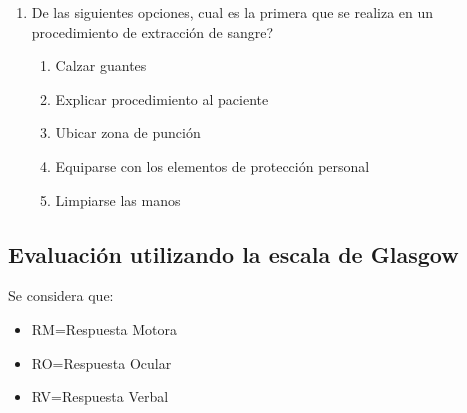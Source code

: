 \begin{enumerate}[label=\bfseries OE\arabic*.:]
\begin{enumerate}
    \end{enumerate}
\item De las siguientes opciones, cual es la primera que se realiza en un
    procedimiento de extracción de sangre?
    \begin{enumerate}
    \item Calzar guantes
    \item Explicar procedimiento al paciente
    \item Ubicar zona de punción
    \item Equiparse con los elementos de protección personal
    \item Limpiarse las manos
    \end{enumerate}
\end{enumerate}

\subsection{Evaluación utilizando la escala de Glasgow}

Se considera que:
\begin{itemize}
\item RM=Respuesta Motora
\item RO=Respuesta Ocular
\item RV=Respuesta Verbal
\end{itemize}

